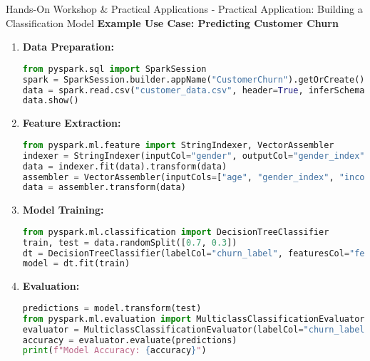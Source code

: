 \documentclass[aspectratio=169]{beamer}
\begin{document}
\begin{frame}[fragile]{Hands-On Workshop \& Practical Applications - Practical Application: Building a Classification Model}
    \textbf{Example Use Case: Predicting Customer Churn}
    \begin{enumerate}
        \item \textbf{Data Preparation:}
        \begin{lstlisting}[language=Python]
from pyspark.sql import SparkSession
spark = SparkSession.builder.appName("CustomerChurn").getOrCreate()
data = spark.read.csv("customer_data.csv", header=True, inferSchema=True)
data.show()
        \end{lstlisting}
        
        \item \textbf{Feature Extraction:}
        \begin{lstlisting}[language=Python]
from pyspark.ml.feature import StringIndexer, VectorAssembler
indexer = StringIndexer(inputCol="gender", outputCol="gender_index")
data = indexer.fit(data).transform(data)
assembler = VectorAssembler(inputCols=["age", "gender_index", "income"], outputCol="features")
data = assembler.transform(data)
        \end{lstlisting}
        
        \item \textbf{Model Training:}
        \begin{lstlisting}[language=Python]
from pyspark.ml.classification import DecisionTreeClassifier
train, test = data.randomSplit([0.7, 0.3])
dt = DecisionTreeClassifier(labelCol="churn_label", featuresCol="features")
model = dt.fit(train)
        \end{lstlisting}
        
        \item \textbf{Evaluation:}
        \begin{lstlisting}[language=Python]
predictions = model.transform(test)
from pyspark.ml.evaluation import MulticlassClassificationEvaluator
evaluator = MulticlassClassificationEvaluator(labelCol="churn_label", predictionCol="prediction", metricName="accuracy")
accuracy = evaluator.evaluate(predictions)
print(f"Model Accuracy: {accuracy}")
        \end{lstlisting}
    \end{enumerate}
\end{frame}
\end{document}

